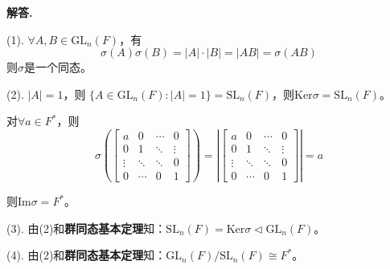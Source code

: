 \documentclass[12pt, a4paper, oneside]{ctexart}
\newenvironment{solution}{\par\noindent\textbf{解答. }}{\bigskip\par}
\begin{document}
\begin{solution}
   
    (1). $\forall A, B\in \text{GL}_n(F)$，有
    \begin{equation*}
        \sigma(A)\sigma(B) = |A|\cdot |B| = |AB| = \sigma(AB)
    \end{equation*}
    则$\sigma$是一个同态。

    (2). $|A|=1$，则 $\{A\in \text{GL}_n(F):|A|=1\}=\text{SL}_n(F)$，则$\text{Ker}\sigma=\text{SL}_n(F)$。

    对$\forall a\in F^*$，则
    \begin{equation*}
        \sigma\left(\begin{bmatrix}
            a&0&\cdots&0\\
            0&1&\ddots&\vdots\\
            \vdots&\ddots&\ddots&0\\
            0&\cdots&0&1
        \end{bmatrix}\right)=\left|\begin{bmatrix}
            a&0&\cdots&0\\
            0&1&\ddots&\vdots\\
            \vdots&\ddots&\ddots&0\\
            0&\cdots&0&1
        \end{bmatrix}\right|=a
    \end{equation*}

    则$\text{Im}\sigma=F^*$。

    (3). 由(2)和\textbf{群同态基本定理}知：$\text{SL}_n(F) = \text{Ker}\sigma\triangleleft \text{GL}_n(F)$。

    (4). 由(2)和\textbf{群同态基本定理}知：$\text{GL}_n(F)/\text{SL}_n(F)\cong F^*$。
\end{solution}
\end{document}

